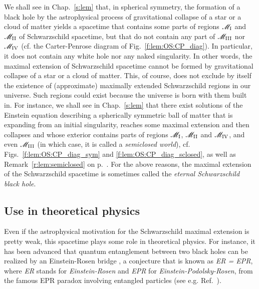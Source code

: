 We shall see in Chap.~\ref{s:lem} that, in spherical symmetry,
the formation of a black hole by the astrophysical
process of gravitational collapse
of a star or a cloud of matter yields a spacetime
that contains some parts of regions $\mathscr{M}_{\rm I}$
and $\mathscr{M}_{\rm II}$ of Schwarzschild spacetime, but that do not contain
any part of $\mathscr{M}_{\rm III}$ nor $\mathscr{M}_{\rm IV}$ (cf. the Carter-Penrose diagram of Fig.~\ref{f:lem:OS:CP_diag}).
In particular, it does not contain any white hole nor
any naked singularity. In other words, the maximal extension of Schwarzschild spacetime
cannot be formed by gravitational collapse of a star or a cloud of matter.
This, of course, does not exclude by itself the existence of (approximate) maximally extended Schwarzschild regions in our universe. Such regions could exist because the universe is born
with them built in. For instance, we shall see in Chap.~\ref{s:lem}
that there exist solutions of the Einstein equation describing a
spherically symmetric ball of matter that is
expanding from an initial singularity, reaches some maximal extension and then collapses and whose
exterior contains parts of regions $\mathscr{M}_{\rm I}$, $\mathscr{M}_{\rm II}$ and $\mathscr{M}_{\rm IV}$, and even $\mathscr{M}_{\rm III}$ (in which case, it is called a \emph{semiclosed world}),
cf. Figs.~\ref{f:lem:OS:CP_diag_sym} and \ref{f:lem:OS:CP_diag_sclosed}, as well as
Remark~\ref{r:lem:semiclosed} on p.~\pageref{r:lem:semiclosed}.
For the above reasons, the maximal extension of the Schwarzschild spacetime
is sometimes called the \emph{eternal Schwarzschild black hole}.


\subsection{Use in theoretical physics}

Even if the astrophysical motivation for the Schwarzschild maximal extension is pretty weak,
this spacetime plays some role in theoretical physics. For instance, it has been advanced
that quantum entanglement between two black holes can be realized by an Einstein-Rosen bridge
\cite{MaldaS13}, a conjecture that is known as \emph{ER = EPR},
where \emph{ER} stands for \emph{Einstein-Rosen} and  \emph{EPR} for \emph{Einstein-Podolsky-Rosen}, from the famous EPR paradox
involving entangled particles (see e.g. Ref.~\cite{LeBel06}).

